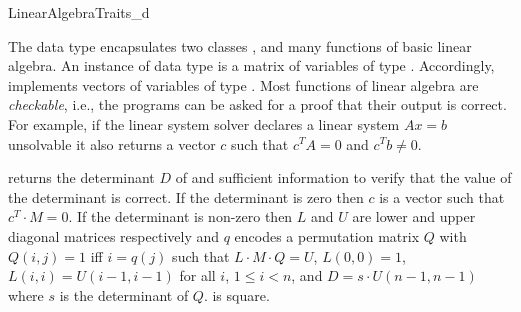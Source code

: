 \begin{ccRefConcept}{LinearAlgebraTraits_d}

\ccDefinition


The data type  encapsulates two classes
,  and many functions of basic linear algebra.
An instance of data type  is a matrix of variables of type
. Accordingly,  implements vectors of variables of
type .  Most functions of linear algebra are \emph{checkable},
i.e., the programs can be asked for a proof that their output is
correct. For example, if the linear system solver declares a linear
system $A x = b$ unsolvable it also returns a vector $c$ such that
$c^T A = 0$ and $c^T b \neq 0$.

\ccSetOneOfTwoColumns{5.5cm}
\ccTypes


\ccSetTwoOfThreeColumns{2cm}{1cm}

\ccOperations




 {returns the determinant $D$ of
   and sufficient information to verify that the value of the
  determinant is correct. If the determinant is zero then $c$ is a
  vector such that $c^T \cdot M = 0$. If the determinant is non-zero
  then $L$ and $U$ are lower and upper diagonal matrices respectively
  and $q$ encodes a permutation matrix $Q$ with $Q(i,j) = 1$ iff $i =
  q(j)$ such that $L \cdot M \cdot Q = U$, $L(0,0) = 1$, $L(i,i) = U(i
  - 1,i - 1)$ for all $i$, $1 \le i < n$, and $D = s \cdot U(n - 1,n -
  1)$ where $s$ is the determinant of $Q$. \ccPrecond {} is
  square.}


\end{ccRefConcept}
